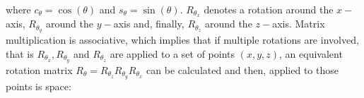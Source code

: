 \begin{refsection}
\begin{align}
\end{align}
where $c_\theta=\cos(\theta)$ and $s_\theta=\sin(\theta)$. $R_{\theta_x}$ denotes a rotation around the $x-$axis, $R_{\theta_y}$ around the $y-$axis and, finally, $R_{\theta_z}$ around the $z-$axis.
Matrix multiplication is associative, which implies that if multiple rotations are involved, that is $R_{\theta_x}, R_{\theta_y}$ and $R_{\theta_z}$ are applied to a set of points $(x,y,z)$, an equivalent rotation matrix $R_{\theta}=R_{\theta_z}R_{\theta_y}R_{\theta_x}$ can be calculated and then, applied to those points is space: 
\begin{align}\label{eq:affine2}

\end{align}
\end{refsection}
